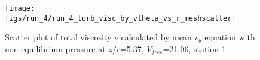 \begin{figure}[H]
\centering
\texttt{[image: figs/run\_4/run\_4\_turb\_visc\_by\_vtheta\_vs\_r\_meshscatter]}
\caption{Scatter plot of total viscosity $\nu$ calculated by mean $\bar{v}_{\theta}$ equation with non-equilibrium pressure at $z/c$=5.37, $V_{free}$=21.06, station 1.}
\label{fig:run_4_turb_visc_by_vtheta_vs_r_meshscatter}
\end{figure}



